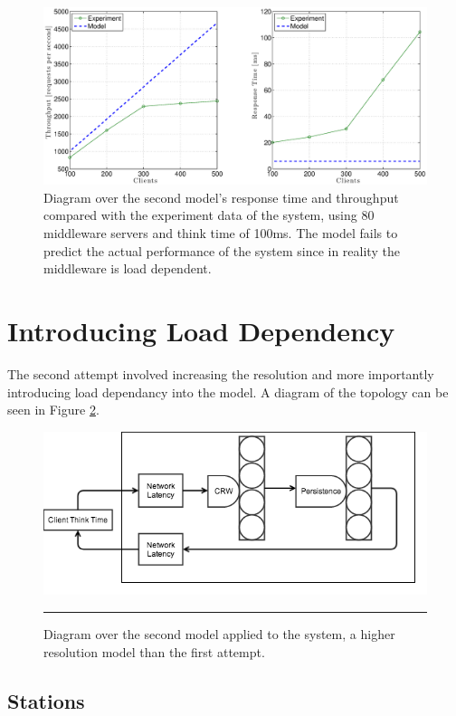 \documentclass[a4paper, 11pt]{article}
\begin{document}
	\begin{figure}[ch!]
		\centering
			\includegraphics[width=1\linewidth,keepaspectratio]{firstRealAndModelFail}
		\caption{Diagram over the second model's response time and throughput compared with the experiment data of the system, using 80 middleware servers and think time of 100ms. The model fails to predict the actual performance of the system since in reality the middleware is load dependent.}
		\label{fig:firstmodelResultsFail}
	\end{figure}
	\FloatBarrier


\section{Introducing Load Dependency}

	The second attempt involved increasing the resolution and more importantly introducing load dependancy into the model. A diagram of the topology can be seen in Figure \ref{fig:second-model}.

	\FloatBarrier
	\begin{figure}[ch!]
		\centering
			\includegraphics[width=0.8\linewidth]{secondmodel}
			\rule{35em}{0.5pt}
		\caption{Diagram over the second model applied to the system, a higher resolution model than the first attempt.}
		\label{fig:second-model}
	\end{figure}
	\FloatBarrier

\subsection{Stations}
\end{document}
